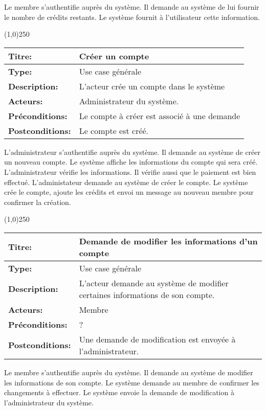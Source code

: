\documentclass[letterpaper,11pt]{letter}
\begin{document}
Le membre s'authentifie auprès du système. Il demande au système de lui fournir le nombre de crédits restants. Le système fournit à l'utilisateur cette information.

\begin{center}
\line(1,0){250}
\end{center}

\begin{tabular}{|l|p{}|}
  \hline
{\bf Titre:} & Créer un compte\\
  \hline
{\bf Type:} & Use case générale\\
\hline
{\bf Description:} & L'acteur crée un compte dans le système\\
\hline
{\bf Acteurs:} & Administrateur du système.\\
\hline
{\bf Préconditions:} & Le compte à créer est associé à une demande\\
\hline
{\bf Postconditions:} & Le compte est créé.\\
\hline
\end{tabular}

L'administrateur s'authentifie auprès du système. Il demande au système de créer un nouveau compte. Le système affiche les informations du compte 
qui sera créé. L'administrateur vérifie les informations. Il vérifie aussi que le paiement est bien effectué. L'administateur demande au système de
créer le compte. Le système crée le compte, ajoute les crédits et envoi un message au nouveau membre pour confirmer la création.

\begin{center}
\line(1,0){250}
\end{center}

\begin{tabular}{|l|p{}|}
  \hline
{\bf Titre:} & Demande de modifier les informations d'un compte\\
  \hline
{\bf Type:} & Use case générale\\
\hline
{\bf Description:} & L'acteur demande au système de modifier certaines informations de son compte.\\
\hline
{\bf Acteurs:} & Membre\\
\hline
{\bf Préconditions:} & ?\\
\hline
{\bf Postconditions:} & Une demande de modification est envoyée à l'administrateur.\\
\hline
\end{tabular}

Le membre s'authentifie auprès du système. Il demande au système de modifier les informations de son compte. Le système demande au membre de confirmer les
changements à effectuer. Le système envoie la demande de modification à l'administrateur du système.
\end{document}
